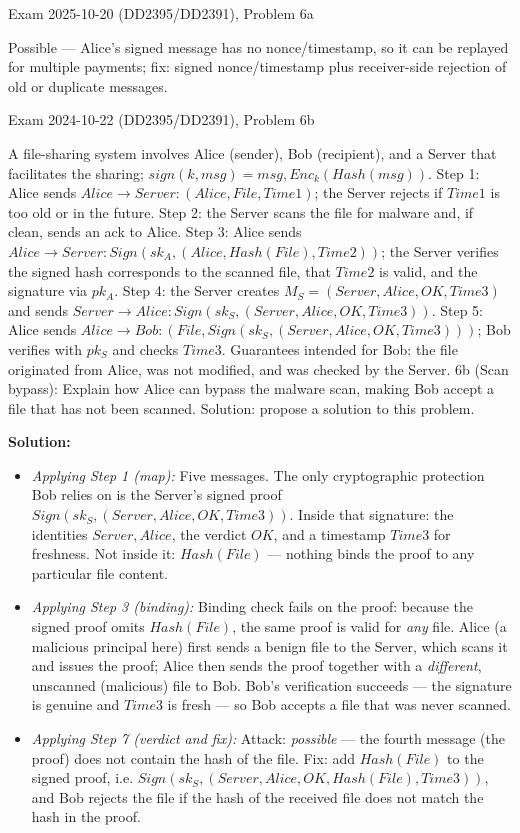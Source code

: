 \documentclass[12pt, a4paper]{article}
\begin{document}
\begin{practicebox}{Exam 2025-10-20 (DD2395/DD2391), Problem 6a}
\begin{answerbox}
Possible --- Alice's signed message has no nonce/timestamp, so it can be replayed for multiple payments; fix: signed nonce/timestamp plus receiver-side rejection of old or duplicate messages.
\end{answerbox}
\end{practicebox}

\begin{practicebox}{Exam 2024-10-22 (DD2395/DD2391), Problem 6b}
\begin{problembox}
A file-sharing system involves Alice (sender), Bob (recipient), and a Server that facilitates the sharing; $sign(k, msg) = msg, Enc_k(Hash(msg))$. Step 1: Alice sends $Alice \to Server : (Alice, File, Time1)$; the Server rejects if $Time1$ is too old or in the future. Step 2: the Server scans the file for malware and, if clean, sends an ack to Alice. Step 3: Alice sends $Alice \to Server : Sign(sk_A, (Alice, Hash(File), Time2))$; the Server verifies the signed hash corresponds to the scanned file, that $Time2$ is valid, and the signature via $pk_A$. Step 4: the Server creates $M_S = (Server, Alice, OK, Time3)$ and sends $Server \to Alice : Sign(sk_S, (Server, Alice, OK, Time3))$. Step 5: Alice sends $Alice \to Bob : (File, Sign(sk_S, (Server, Alice, OK, Time3)))$; Bob verifies with $pk_S$ and checks $Time3$. Guarantees intended for Bob: the file originated from Alice, was not modified, and was checked by the Server. 6b (Scan bypass): Explain how Alice can bypass the malware scan, making Bob accept a file that has not been scanned. Solution: propose a solution to this problem.
\end{problembox}

\textbf{Solution:}
\begin{itemize}
    \item \textit{Applying Step 1 (map):} Five messages. The only cryptographic protection Bob relies on is the Server's signed proof $Sign(sk_S, (Server, Alice, OK, Time3))$.
    Inside that signature: the identities $Server, Alice$, the verdict $OK$, and a timestamp $Time3$ for freshness. Not inside it: $Hash(File)$ --- nothing binds the proof to any particular file content.
    \item \textit{Applying Step 3 (binding):} Binding check fails on the proof: because the signed proof omits $Hash(File)$, the same proof is valid for \emph{any} file.
    Alice (a malicious principal here) first sends a benign file to the Server, which scans it and issues the proof; Alice then sends the proof together with a \emph{different}, unscanned (malicious) file to Bob.
    Bob's verification succeeds --- the signature is genuine and $Time3$ is fresh --- so Bob accepts a file that was never scanned.
    \item \textit{Applying Step 7 (verdict and fix):} Attack: \emph{possible} --- the fourth message (the proof) does not contain the hash of the file. Fix: add $Hash(File)$ to the signed proof, i.e. $Sign(sk_S, (Server, Alice, OK, Hash(File), Time3))$, and Bob rejects the file if the hash of the received file does not match the hash in the proof.
\end{itemize}


\end{practicebox}
\end{document}
